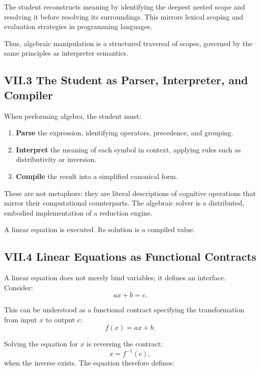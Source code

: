 \documentclass[11pt,letterpaper]{article}
\begin{document}
The student reconstructs meaning by identifying the deepest nested scope and resolving it before resolving its surroundings. This mirrors lexical scoping and evaluation strategies in programming languages.

Thus, algebraic manipulation is a structured traversal of scopes, governed by the same principles as interpreter semantics.

\subsection{VII.3 The Student as Parser, Interpreter, and Compiler}

When performing algebra, the student must:

\begin{enumerate}
    \item \textbf{Parse} the expression, identifying operators, precedence, and grouping.
    \item \textbf{Interpret} the meaning of each symbol in context, applying rules such as distributivity or inversion.
    \item \textbf{Compile} the result into a simplified canonical form.
\end{enumerate}

These are not metaphors: they are literal descriptions of cognitive operations that mirror their computational counterparts. The algebraic solver is a distributed, embodied implementation of a reduction engine.

A linear equation is executed. Its solution is a compiled value.

\subsection{VII.4 Linear Equations as Functional Contracts}

A linear equation does not merely bind variables; it defines an interface. Consider:
\[
ax + b = c.
\]

This can be understood as a functional contract specifying the transformation from input \(x\) to output \(c\):
\[
f(x) = ax + b.
\]

Solving the equation for \(x\) is reversing the contract:
\[
x = f^{-1}(c),
\]
when the inverse exists. The equation therefore defines:
\end{document}
